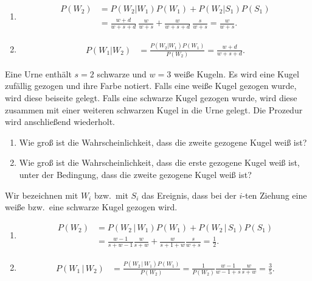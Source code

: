 \solution
\begin{enumerate}
    \item \begin{align*}
            P(W_2) &= P(W_2 | W_1) P(W_1) + P(W_2 | S_1) P(S_1) \\
            &= \frac{w+d}{w+s+d}\ \frac{w}{w+s} + \frac{w}{w+s+d}\ \frac{s}{w+s} = \frac{w}{w+s}.
        \end{align*}

    \item \begin{align*}
            P(W_1 | W_2 ) &= \frac{ P(W_2 | W_1) P(W_1)  }{ P(W_2) } = \frac{w+d}{w+s+d}.
        \end{align*}
        
\end{enumerate}


 Eine Urne enthält $s=2$ schwarze und
$w=3$ weiße Kugeln. Es wird eine Kugel zufällig gezogen und ihre Farbe notiert.
Falls eine weiße Kugel gezogen wurde, wird diese beiseite gelegt. Falls eine
schwarze Kugel gezogen wurde, wird diese zusammen mit einer weiteren schwarzen
Kugel in die Urne gelegt. Die Prozedur wird anschließend wiederholt.
\begin{enumerate}
    \item Wie groß ist die Wahrscheinlichkeit, dass die zweite gezogene Kugel
        weiß ist?
    \item Wie groß ist die Wahrscheinlichkeit, dass die erste gezogene Kugel
        weiß ist, unter der Bedingung, dass die zweite gezogene Kugel weiß ist?
\end{enumerate}

\solution
Wir bezeichnen mit $W_i$ bzw.\ mit $S_i$ das Ereignis, dass bei der $i$-ten
Ziehung eine weiße bzw.\ eine schwarze Kugel gezogen wird.
\begin{enumerate}
    \item \begin{align*}
            P(W_2) &= P(W_2 \,|\, W_1)P(W_1) + P(W_2 \,|\, S_1)P(S_1) \\
            &= \frac{w-1}{s+w-1} \frac{w}{s+w} + \frac{w}{s+1+w} \frac{s}{w+s} = \frac{1}{2}. 
        \end{align*}
    \item \begin{align*}
            P( W_1 \,|\, W_2 ) &= \frac{P(W_2 \,|\, W_1) P(W_1)}{P(W_2)} = 
            \frac{1}{P(W_2)} \frac{ w-1 }{w-1+s}\frac{w}{s+w} = \frac{3}{5}. 
        \end{align*}
\end{enumerate}



